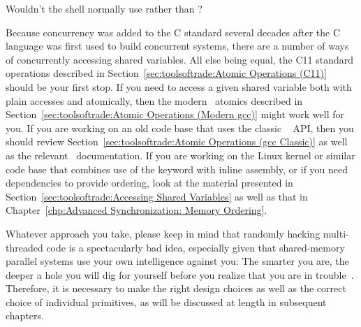 \QuickQuiz{}
	Wouldn't the shell normally use  rather than
	?
 \QuickQuizEnd

Because concurrency was added to the C standard several decades after
the C language was first used to build concurrent systems, there are
a number of ways of concurrently accessing shared variables.
All else being equal, the C11 standard operations described in
Section~\ref{sec:toolsoftrade:Atomic Operations (C11)}
should be your first stop.
If you need to access a given shared variable both with plain accesses
and atomically, then the modern \GCC\ atomics described in
Section~\ref{sec:toolsoftrade:Atomic Operations (Modern gcc)}
might work well for you.
If you are working on an old code base that uses the classic \GCC\ 
API, then you should review
Section~\ref{sec:toolsoftrade:Atomic Operations (gcc Classic)}
as well as the relevant \GCC\ documentation.
If you are working on the Linux kernel or similar code base that
combines use of the  keyword with inline assembly,
or if you need dependencies to provide ordering, look at the material
presented in Section~\ref{sec:toolsoftrade:Accessing Shared Variables}
as well as that in
Chapter~\ref{chp:Advanced Synchronization: Memory Ordering}.

Whatever approach you take, please keep in mind that randomly hacking
multi-threaded code is a spectacularly bad idea, especially given that
shared-memory parallel systems use your own intelligence against you:
The smarter you are, the deeper a hole you will dig for yourself before
you realize that you are in trouble~\cite{DeadlockEmpire2016}.
Therefore, it is necessary to make the right design choices as well as
the correct choice of individual primitives,
as will be discussed at length in subsequent chapters.
